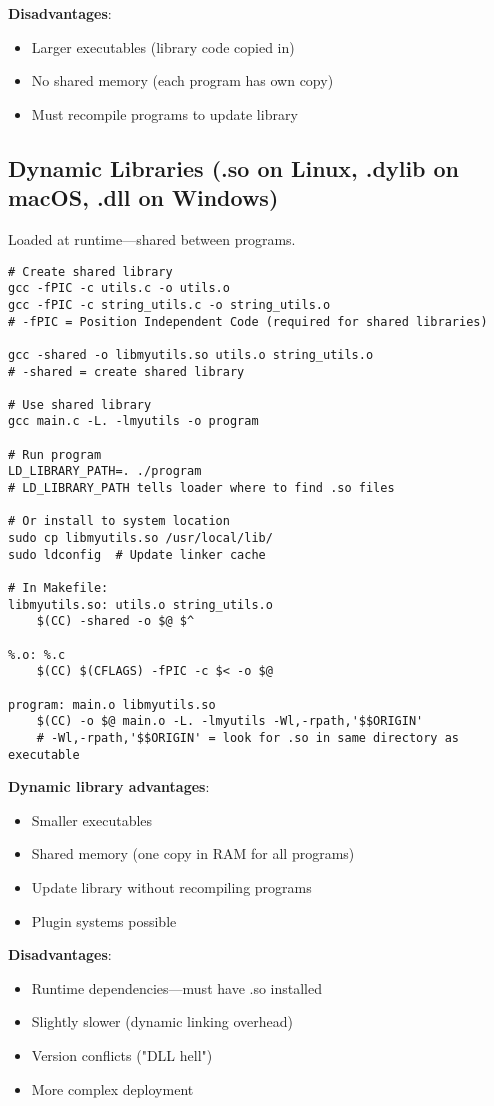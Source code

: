 \textbf{Disadvantages}:
\begin{itemize}
    \item Larger executables (library code copied in)
    \item No shared memory (each program has own copy)
    \item Must recompile programs to update library
\end{itemize}

\subsection{Dynamic Libraries (.so on Linux, .dylib on macOS, .dll on Windows)}

Loaded at runtime---shared between programs.

\begin{lstlisting}
# Create shared library
gcc -fPIC -c utils.c -o utils.o
gcc -fPIC -c string_utils.c -o string_utils.o
# -fPIC = Position Independent Code (required for shared libraries)

gcc -shared -o libmyutils.so utils.o string_utils.o
# -shared = create shared library

# Use shared library
gcc main.c -L. -lmyutils -o program

# Run program
LD_LIBRARY_PATH=. ./program
# LD_LIBRARY_PATH tells loader where to find .so files

# Or install to system location
sudo cp libmyutils.so /usr/local/lib/
sudo ldconfig  # Update linker cache

# In Makefile:
libmyutils.so: utils.o string_utils.o
	$(CC) -shared -o $@ $^

%.o: %.c
	$(CC) $(CFLAGS) -fPIC -c $< -o $@

program: main.o libmyutils.so
	$(CC) -o $@ main.o -L. -lmyutils -Wl,-rpath,'$$ORIGIN'
	# -Wl,-rpath,'$$ORIGIN' = look for .so in same directory as executable
\end{lstlisting}

\textbf{Dynamic library advantages}:
\begin{itemize}
    \item Smaller executables
    \item Shared memory (one copy in RAM for all programs)
    \item Update library without recompiling programs
    \item Plugin systems possible
\end{itemize}

\textbf{Disadvantages}:
\begin{itemize}
    \item Runtime dependencies---must have .so installed
    \item Slightly slower (dynamic linking overhead)
    \item Version conflicts ("DLL hell")
    \item More complex deployment
\end{itemize}

